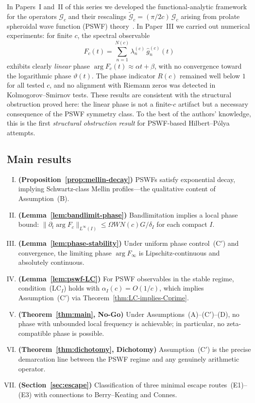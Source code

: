 \documentclass[12pt,a4paper]{amsart}
\theoremstyle{definition}
\newcommand{\Gc}{\mathcal{G}_c}
\newcommand{\tGc}{\widetilde{\mathcal{G}}_c}
\begin{document}
In Papers~I and~II of this series we developed the
functional-analytic framework for the operators $\Gc$
and their rescalings $\tGc = (\pi/2c)\,\Gc$ arising
from prolate spheroidal wave function (PSWF)
theory~\cite{Slepian1961,Landau1962}. In Paper~III we
carried out numerical experiments: for finite $c$, the
spectral observable
\[
F_c(t)
= \sum_{n=1}^{N(c)} \lambda_n^{(c)}\,
\widehat{g}_n^{(c)}(t)
\]
exhibits clearly \emph{linear} phase
$\arg F_c(t) \approx \alpha t + \beta$, with no
convergence toward the logarithmic phase $\vartheta(t)$.
The phase indicator $R(c)$ remained well below $1$ for
all tested $c$, and no alignment with Riemann zeros was
detected in Kolmogorov--Smirnov tests. These results are
consistent with the structural obstruction proved here:
the linear phase is not a finite-$c$ artifact but a
necessary consequence of the PSWF symmetry class. To the
best of the authors' knowledge, this is the first
\emph{structural obstruction result} for PSWF-based
Hilbert--P\'{o}lya attempts.

\subsection*{Main results}

\begin{enumerate}[(I)]
\item \textbf{(Proposition~\ref{prop:mellin-decay})}
PSWFs satisfy exponential decay, implying Schwartz-class
Mellin profiles---the qualitative content of
Assumption~(B).
\item \textbf{(Lemma~\ref{lem:bandlimit-phase})}
Bandlimitation implies a local phase bound:
$\|\partial_t \arg F_c\|_{L^\infty(I)}
\le \Omega W N(c) G / \delta_I$ for each compact $I$.
\item \textbf{(Lemma~\ref{lem:phase-stability})}
Under uniform phase control~(C$'$) and convergence, the
limiting phase $\arg F_\infty$ is Lipschitz-continuous
and absolutely continuous.
\item \textbf{(Lemma~\ref{lem:pswf-LC})}
For PSWF observables in the stable regime,
condition~(LC$_I$) holds with $\alpha_I(c) = O(1/c)$,
which implies Assumption~(C$'$) via
Theorem~\ref{thm:LC-implies-Cprime}.
\item \textbf{(Theorem~\ref{thm:main}, No-Go)}
Under Assumptions~(A)--(C$'$)--(D), no phase with
unbounded local frequency is achievable; in particular,
no zeta-compatible phase is possible.
\item \textbf{(Theorem~\ref{thm:dichotomy}, Dichotomy)}
Assumption~(C$'$) is the precise demarcation line between
the PSWF regime and any genuinely arithmetic operator.
\item \textbf{(Section~\ref{sec:escape})}
Classification of three minimal escape routes~(E1)--(E3)
with connections to Berry--Keating and Connes.
\end{enumerate}
\end{document}
